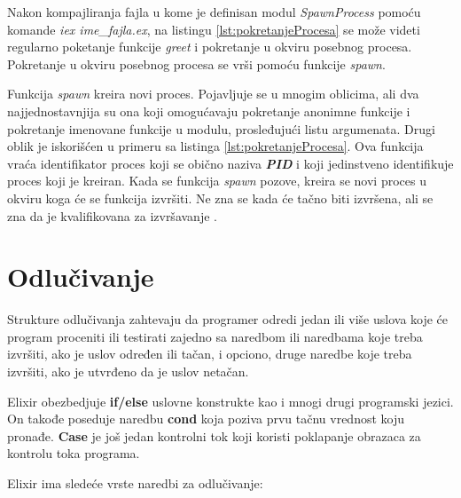 \documentclass[12pt,oneside]{memoir}
\begin{document}


\noindent Nakon kompajliranja fajla u kome je definisan modul \textit{SpawnProcess} pomoću komande \textit{iex ime\_fajla.ex}, na listingu \ref{lst:pokretanjeProcesa} se može videti regularno poketanje funkcije \textit{greet} i pokretanje u okviru posebnog procesa. Pokretanje u okviru posebnog procesa se vrši pomoću funkcije \textit{spawn}.



Funkcija \textit{spawn} kreira novi proces. Pojavljuje se u mnogim oblicima, ali dva najjednostavnjija su ona koji omogućavaju pokretanje anonimne funkcije i pokretanje imenovane funkcije u modulu, prosleđujući listu argumenata. Drugi oblik je iskorišćen u primeru sa listinga \ref{lst:pokretanjeProcesa}. Ova funkcija vraća identifikator proces koji se obično naziva \textit{\textbf{PID}} i koji jedinstveno identifikuje proces koji je kreiran. Kada se funkcija \textit{spawn} pozove, kreira se novi proces u okviru koga će se funkcija izvršiti. Ne zna se kada će tačno biti izvršena, ali se zna da je kvalifikovana za izvršavanje \cite{ProgrammingElixir}.

\section{Odlučivanje}

Strukture odlučivanja zahtevaju da programer odredi jedan ili više uslova koje će program proceniti ili testirati zajedno sa naredbom ili naredbama koje treba izvršiti, ako je uslov određen ili tačan, i opciono, druge naredbe koje treba izvršiti, ako je utvrđeno da je uslov netačan.

Elixir obezbedjuje \textbf{if/else} uslovne konstrukte kao i mnogi drugi programski jezici. On takođe poseduje naredbu \textbf{cond} koja poziva prvu tačnu vrednost koju pronađe. \textbf{Case} je još jedan kontrolni tok koji koristi poklapanje obrazaca za kontrolu toka programa.

Elixir ima sledeće vrste naredbi za odlučivanje:
\end{document}

